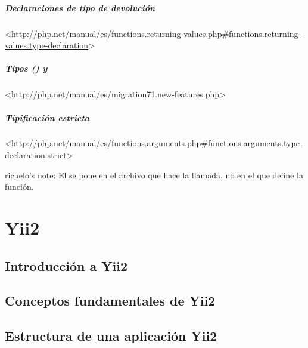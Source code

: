 \documentclass[a4paper,11pt,spanish]{sphinxmanual}
\begin{document}
\subsubsection{Declaraciones de tipo de devolución}
\label{\detokenize{php:declaraciones-de-tipo-de-devolucion}}
\textless{}\url{http://php.net/manual/es/functions.returning-values.php\#functions.returning-values.type-declaration}\textgreater{}


\subsubsection{Tipos  () y }
\label{\detokenize{php:tipos-nullable-y-void}}
\textless{}\url{http://php.net/manual/es/migration71.new-features.php}\textgreater{}


\subsubsection{Tipificación estricta}
\label{\detokenize{php:tipificacion-estricta}}
\textless{}\url{http://php.net/manual/es/functions.arguments.php\#functions.arguments.type-declaration.strict}\textgreater{}

ricpelo's note: El  se pone en el archivo
que hace la llamada, no en el que define la función.


\part{Yii2}
\label{\detokenize{yii2:yii2}}\label{\detokenize{yii2::doc}}

\chapter{Introducción a Yii2}
\label{\detokenize{yii2:introduccion-a-yii2}}

\chapter{Conceptos fundamentales de Yii2}
\label{\detokenize{yii2:conceptos-fundamentales-de-yii2}}

\chapter{Estructura de una aplicación Yii2}
\label{\detokenize{yii2:estructura-de-una-aplicacion-yii2}}
\end{document}
